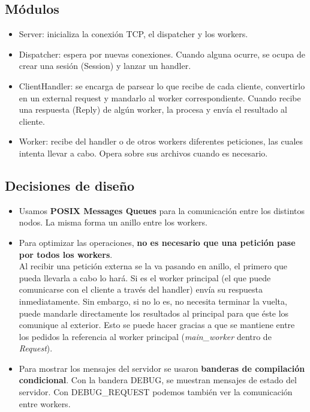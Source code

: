 \documentclass[a4paper,12pt]{article}
\begin{document}
    \subsection*{Módulos}
    \begin{itemize}
    \item Server: inicializa la conexión TCP, el dispatcher y los workers.
    \item Dispatcher: espera por nuevas conexiones. Cuando alguna ocurre, se ocupa de crear una sesión (Session) y lanzar un handler.
    \item ClientHandler: se encarga de parsear lo que recibe de cada cliente, convertirlo en un external request y mandarlo al worker correspondiente. Cuando recibe una respuesta (Reply) de algún worker, la procesa y envía el resultado al cliente.
     \item Worker: recibe del handler o de otros workers diferentes peticiones, las cuales intenta llevar a cabo. Opera sobre sus archivos cuando es necesario.
    \end{itemize}
    
    \subsection*{Decisiones de diseño}
	\begin{itemize}
	\item Usamos \textbf{POSIX Messages Queues} para la comunicación entre los distintos nodos. La misma forma un anillo entre los workers.
    \item Para optimizar las operaciones, \textbf{no es necesario que una petición pase por todos los workers}.\\
    Al recibir una petición externa se la va pasando en anillo, el primero que pueda llevarla a cabo lo hará. Si es el worker principal (el que puede comunicarse con el cliente a través del handler) envía su respuesta inmediatamente. Sin embargo, si no lo es, no necesita terminar la vuelta, puede mandarle directamente los resultados al principal para que éste los comunique al exterior. Esto se puede hacer gracias a que se mantiene entre los pedidos la referencia al worker principal (\textit{main\_worker} dentro de \textit{Request}).
    \item Para mostrar los mensajes del servidor se usaron \textbf{banderas de compilación condicional}. Con la bandera DEBUG, se muestran mensajes de estado del servidor. Con DEBUG\_REQUEST podemos también ver la comunicación entre workers.\\
    \end{itemize}
 
\end{document}

